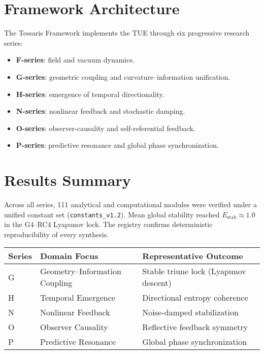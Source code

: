 \documentclass[12pt]{article}
\begin{document}
\section{Framework Architecture}
The Tessaris Framework implements the TUE through six progressive research series:
\begin{itemize}
\item \textbf{F-series}: field and vacuum dynamics.
\item \textbf{G-series}: geometric coupling and curvature–information unification.
\item \textbf{H-series}: emergence of temporal directionality.
\item \textbf{N-series}: nonlinear feedback and stochastic damping.
\item \textbf{O-series}: observer-causality and self-referential feedback.
\item \textbf{P-series}: predictive resonance and global phase synchronization.
\end{itemize}

\section{Results Summary}
Across all series, 111 analytical and computational modules were verified under a unified constant set (\texttt{constants\_v1.2}).  
Mean global stability reached \(E_{\text{stab}}\approx1.0\) in the G4–RC4 Lyapunov lock.  
The registry confirms deterministic reproducibility of every synthesis.

\begin{table}[h]
\centering
\begin{tabular}{|l|l|l|}
\hline
Series & Domain Focus & Representative Outcome\\
\hline
G & Geometry--Information Coupling & Stable triune lock (Lyapunov descent)\\
H & Temporal Emergence & Directional entropy coherence\\
N & Nonlinear Feedback & Noise-damped stabilization\\
O & Observer Causality & Reflective feedback symmetry\\
P & Predictive Resonance & Global phase synchronization\\
\hline
\end{tabular}
\end{table}
\end{document}
